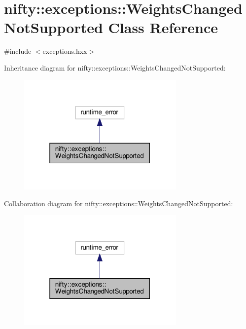 \hypertarget{classnifty_1_1exceptions_1_1WeightsChangedNotSupported}{}\section{nifty\+:\+:exceptions\+:\+:Weights\+Changed\+Not\+Supported Class Reference}
\label{classnifty_1_1exceptions_1_1WeightsChangedNotSupported}


{\ttfamily \#include $<$exceptions.\+hxx$>$}



Inheritance diagram for nifty\+:\+:exceptions\+:\+:Weights\+Changed\+Not\+Supported\+:
\nopagebreak
\begin{figure}[H]
\begin{center}
\leavevmode
\includegraphics[width=232pt]{classnifty_1_1exceptions_1_1WeightsChangedNotSupported__inherit__graph}
\end{center}
\end{figure}


Collaboration diagram for nifty\+:\+:exceptions\+:\+:Weights\+Changed\+Not\+Supported\+:
\nopagebreak
\begin{figure}[H]
\begin{center}
\leavevmode
\includegraphics[width=232pt]{classnifty_1_1exceptions_1_1WeightsChangedNotSupported__coll__graph}
\end{center}
\end{figure}
